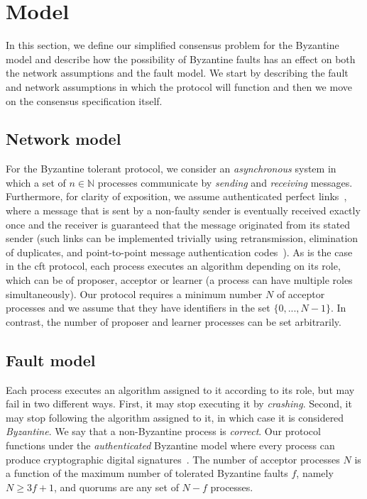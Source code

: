 \section{Model} \label{bft_model}

In this section, we define our simplified consensus problem for the Byzantine model and describe how the possibility of Byzantine faults has an effect on both the network assumptions and the fault model. We start by describing the fault and network assumptions in which the protocol will function and then we move on the consensus specification itself.

\subsection{Network model}
For the Byzantine tolerant protocol, we consider an \emph{asynchronous} system in which a set of $n \in \mathbb{N}$ processes communicate by \emph{sending} and \emph{receiving} messages. Furthermore, for clarity of exposition, we assume authenticated perfect links~\cite{cgr:book}, where a message that is sent by a non-faulty sender is eventually received exactly once and the receiver is guaranteed that the message originated from its stated sender (such links can be implemented trivially using retransmission, elimination of duplicates, and point-to-point message authentication codes~\cite{cgr:book}). As is the case in the \acrshort{cft} protocol, each process executes an algorithm depending on its role, which can be of proposer, acceptor or learner (a process can have multiple roles simultaneously). Our protocol requires a minimum number $N$ of acceptor processes and we assume that they have identifiers in the set $\{0,...,N-1\}$. In contrast, the number of proposer and learner processes can be set arbitrarily.

\subsection{Fault model}
Each process executes an algorithm assigned to it according to its role, but may fail in two different ways. First, it may stop executing it by \emph{crashing}. Second, it may stop following the algorithm assigned to it, in which case it is considered \emph{Byzantine}. We say that a non-Byzantine process is \emph{correct}. Our protocol functions under the \emph{authenticated} Byzantine model where every process can produce cryptographic digital signatures~\cite{quorum}. The number of acceptor processes $N$ is a function of the maximum number of tolerated Byzantine faults $f$, namely $N \ge 3f+1$, and quorums are any set of $N-f$ processes. 

